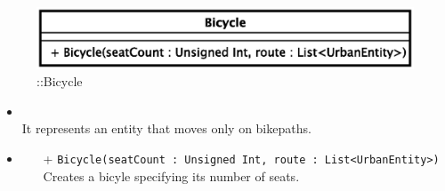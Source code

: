\begin{figure}[h]
\centering
\includegraphics[scale=0.6,keepaspectratio]{images/solution/app/backend/bicycle.eps}
\caption{\pActive::Bicycle}
\label{fig:sd-app-bicycle}
\end{figure}
\FloatBarrier
\begin{itemize}
  \item \textbf{\descr} \\
It represents an entity that moves only on bikepaths.
  \item \textbf{\ops}
  \begin{itemize}
  \item[+] \texttt{Bicycle(seatCount : Unsigned Int, route : List<UrbanEntity>)} \\
Creates a bicyle specifying its number of seats.
  \end{itemize}
\end{itemize} 
